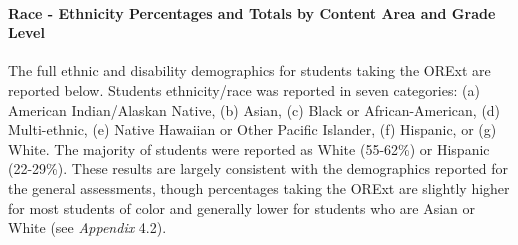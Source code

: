 \documentclass[]{article}
\let\oldparagraph\paragraph
\renewcommand{\paragraph}[1]{\oldparagraph{#1}\mbox{}}
\begin{document}
\paragraph{Race - Ethnicity Percentages and Totals by Content Area and
Grade
Level}\label{race---ethnicity-percentages-and-totals-by-content-area-and-grade-level}

The full ethnic and disability demographics for students taking the
ORExt are reported below. Students ethnicity/race was reported in seven
categories: (a) American Indian/Alaskan Native, (b) Asian, (c) Black or
African-American, (d) Multi-ethnic, (e) Native Hawaiian or Other Pacific
Islander, (f) Hispanic, or (g) White. The majority of students were
reported as White (55-62\%) or Hispanic (22-29\%). These results are
largely consistent with the demographics reported for the general
assessments, though percentages taking the ORExt are slightly higher for
most students of color and generally lower for students who are Asian or
White (see \emph{Appendix} 4.2).
\end{document}
